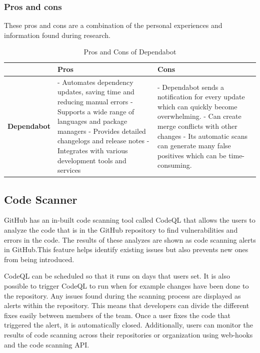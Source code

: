 \subsubsection{Pros and cons}
These pros and cons are a combination of the personal experiences and information found during research. \cite{prosconsdependabot} 

\begin{table}[H]
\centering
\begin{tabular}{|c|p{6cm}|p{6cm}|}
\hline
 & \textbf{Pros} & \textbf{Cons} \\
\hline
\textbf{Dependabot} & 
- Automates dependency updates, saving time and reducing manual errors \newline
- Supports a wide range of languages and package managers \newline
- Provides detailed changelogs and release notes \newline
- Integrates with various development tools and services &
- Dependabot sends a notification for every update which can quickly 
  become overwhelming. \newline
- Can create merge conflicts with other changes \newline
- Its automatic scans can generate many false positives which can be 
  time-consuming. \\
\hline
\end{tabular}
\caption{Pros and Cons of Dependabot}
\label{tab:dependabot}
\end{table}

\subsection{Code Scanner}
GitHub has an in-built code scanning tool called CodeQL that allows the users to analyze the code that is in the GitHub repository to find vulnerabilities and errors in the code. The results of these analyzes are shown as code scanning alerts in GitHub.This feature helps identify existing issues but also prevents new ones from being introduced. \cite{CodeQL1}

CodeQL can be scheduled so that it runs on days that users set. It is also possible to trigger CodeQL to run when for example changes have been done to the repository.
Any issues found during the scanning process are displayed as alerts within the repository. This means that developers can divide the different fixes easily between members of the team.  Once a user fixes the code that triggered the alert, it is automatically closed. Additionally, users can monitor the results of code scanning across their repositories or organization using web-hooks and the code scanning API. 
\cite{GithubCodeScanning}

